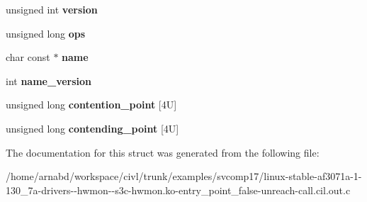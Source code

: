 \begin{DoxyCompactItemize}
\item 
\hypertarget{structlock__class_a894ae7bd3b7ee320f067389f4d5fa2ff}{}unsigned int {\bfseries version}\label{structlock__class_a894ae7bd3b7ee320f067389f4d5fa2ff}

\item 
\hypertarget{structlock__class_acbac5979b05da5306474495e494519b1}{}unsigned long {\bfseries ops}\label{structlock__class_acbac5979b05da5306474495e494519b1}

\item 
\hypertarget{structlock__class_a1d20053fe96281b45c07001fdfe1e324}{}char const $\ast$ {\bfseries name}\label{structlock__class_a1d20053fe96281b45c07001fdfe1e324}

\item 
\hypertarget{structlock__class_ad289df71d135a5ffb1fa17300279d68d}{}int {\bfseries name\+\_\+version}\label{structlock__class_ad289df71d135a5ffb1fa17300279d68d}

\item 
\hypertarget{structlock__class_a4536ef7203de92bc053fed3e74cb9ea3}{}unsigned long {\bfseries contention\+\_\+point} \mbox{[}4\+U\mbox{]}\label{structlock__class_a4536ef7203de92bc053fed3e74cb9ea3}

\item 
\hypertarget{structlock__class_a356318b1275c7cecea85668e61d383d4}{}unsigned long {\bfseries contending\+\_\+point} \mbox{[}4\+U\mbox{]}\label{structlock__class_a356318b1275c7cecea85668e61d383d4}

\end{DoxyCompactItemize}


The documentation for this struct was generated from the following file\+:\begin{DoxyCompactItemize}
\item 
/home/arnabd/workspace/civl/trunk/examples/svcomp17/linux-\/stable-\/af3071a-\/1-\/130\+\_\+7a-\/drivers-\/-\/hwmon-\/-\/s3c-\/hwmon.\+ko-\/entry\+\_\+point\+\_\+false-\/unreach-\/call.\+cil.\+out.\+c\end{DoxyCompactItemize}
